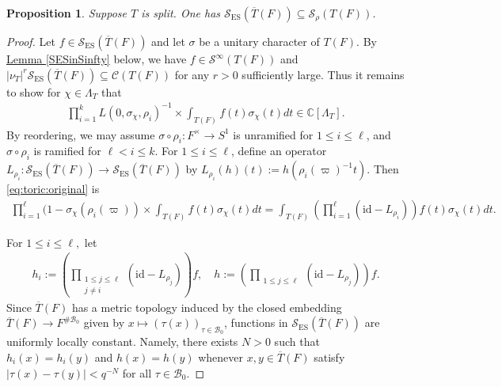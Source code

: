\documentclass[10pt]{amsart}
\newtheorem{proposition}[theorem]{Proposition}
\theoremstyle{definition}
\numberwithin{equation}{section}
\numberwithin{equation}{subsection}
\newcommand{\CC}{\mathbb{C}}
\begin{document}
\begin{proposition}\label{prop:ESinrho} Suppose $T$ is split. One has $\mathcal{S}_{\mathrm{ES}}(\overline{T}(F))\subseteq \mathcal{S}_\rho(T(F))$.
\end{proposition}
\begin{proof} Let $f\in \mathcal{S}_{\mathrm{ES}}(\overline{T}(F))$ and let $\sigma$ be a unitary character of $T(F)$. By \hyperref[SESinSinfty]{Lemma \ref{SESinSinfty}} below, we have $f\in \mathcal{S}^\infty(T(F))$ and $|\nu_T|^r\mathcal{S}_{\mathrm{ES}}(\overline{T}(F))\subseteq \mathcal{C}(T(F))$ for any $r>0$ sufficiently large. Thus it remains to show for $\chi\in \Lambda_T$ that
\begin{align}\label{eq:toric:original}
     \prod_{i=1}^k L(0,\sigma_\chi,\rho_i)^{-1} \times \int_{T(F)} f(t)\sigma_\chi(t)dt\in \CC[\Lambda_T].
\end{align}
By reordering, we may assume $\sigma\circ \rho_i:F^\times\to S^1$ is unramified for $1\le i\le \ell$, and $\sigma\circ\rho_i$ is ramified for $\ell<i\le k$. For $1\le i\le\ell$, define an operator $L_{\rho_i}:\mathcal{S}_{\mathrm{ES}}(\overline{T}(F))\to \mathcal{S}_{\mathrm{ES}}(\overline{T}(F))$ by $L_{\rho_i}(h)(t) := h(\rho_i(\varpi)^{-1}t).$
Then \eqref{eq:toric:original} is
\begin{align*}
    \prod_{i=1}^\ell (1-\sigma_\chi(\rho_i(\varpi))\times \int_{T(F)} f(t)\sigma_\chi(t)dt = \int_{T(F)} \left(\prod_{i=1}^\ell(\mathrm{id}-L_{\rho_i})\right)f(t) \sigma_\chi(t) dt.
\end{align*}

For $1\le i\le \ell,$ let 
\begin{align*}
h_i := \left(\prod_{\substack{1\leq j\leq \ell\\j\neq i}}(\mathrm{id}-L_{\rho_j})\right)f, \quad  h:=\left(\prod_{\substack{1\leq j\leq \ell}}(\mathrm{id}-L_{\rho_j})\right)f.
\end{align*}
Since $\overline{T}(F)$ has a metric topology induced by the closed embedding $\overline{T}(F)\to F^{\#\mathcal{B}_0}$ given by $x\mapsto (\tau(x))_{\tau\in\mathcal{B}_0}$, functions in $\mathcal{S}_{\mathrm{ES}}(\overline{T}(F))$ are uniformly locally constant. Namely, there exists $N>0$ such that  $h_i(x) = h_i(y)$ and $h(x) = h(y)$ whenever $x,y\in \overline{T}(F)$ satisfy $|\tau(x) - \tau(y)|< q^{-N}$ for all $\tau\in \mathcal{B}_0$.


\end{proof}
\end{document}
